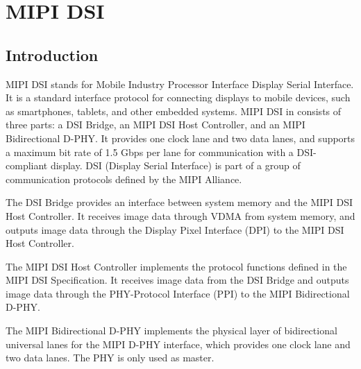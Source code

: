 \documentclass[main\_\_EN.tex]{subfiles}
\begin{document}

\ifglobal
\else
    {\let\clearpage\relax \listoftodos}
    {\let\clearpage\relax \listofdonetodos}
    \tableofcontents
\fi



\hypertarget{mipidsi}{}
\chapter{MIPI DSI}
\label{mod:mipidsi}



\section{Introduction}
MIPI DSI stands for Mobile Industry Processor Interface Display Serial Interface. It is a standard interface protocol for connecting displays to mobile devices, such as smartphones, tablets, and other embedded systems. MIPI DSI in \chipseries{} consists of three parts: a DSI Bridge, an MIPI DSI Host Controller, and an MIPI Bidirectional D-PHY. It provides one clock lane and two data lanes, and supports a maximum bit rate of 1.5 Gbps per lane for communication with a DSI-compliant display. DSI (Display Serial Interface) is part of a group of communication protocols defined by the MIPI Alliance.

The DSI Bridge provides an interface between system memory and the MIPI DSI Host Controller. It receives image data through VDMA from system memory, and outputs image data through the Display Pixel Interface (DPI) to the MIPI DSI Host Controller.

The MIPI DSI Host Controller implements the protocol functions defined in the MIPI DSI Specification. It receives image data from the DSI Bridge and outputs image data through the PHY-Protocol Interface (PPI) to the MIPI Bidirectional D-PHY.

The MIPI Bidirectional D-PHY implements the physical layer of bidirectional universal lanes for the MIPI D-PHY interface, which provides one clock lane and two data lanes. The PHY is only used as master.
\end{document}
